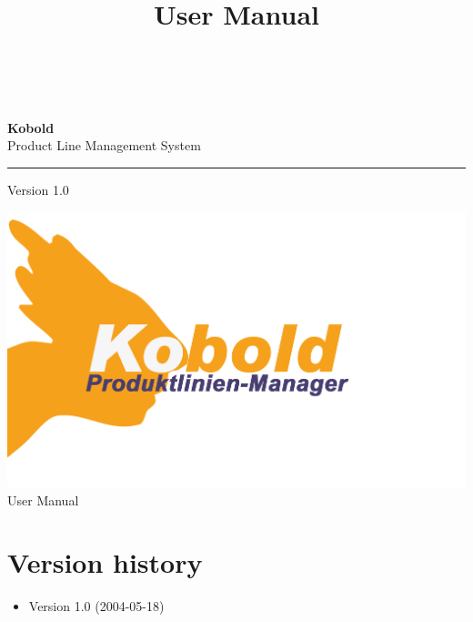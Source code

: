 \documentclass[a4paper,titlepage,12pt]{scrbook}
\title {\huge \product\\[0.5cm]\large User Manual \\[0.5cm] \version
  \\[1cm] \Large \company}
\newcommand\version{Version 1.0\xspace}
\begin{document}

\begin{titlepage}
\renewcommand{\thefootnote}{\fnsymbol{footnote}}
{\Huge
\raggedright
\textbf{\bf Kobold} \\
\huge Product Line Management System
\rule{\textwidth}{0.75pt}
\par
}
\begin{flushleft}
\normalsize
\version
\end{flushleft}


\vfill
\includegraphics[width=15cm]{../common/logo-color.png}
\vfill
{\parindent=0cm
\Huge User Manual
}


\setcounter{footnote}{0}
\end{titlepage}


\section*{Version history}

\begin{itemize}

\item Version 1.0 (2004-05-18)

\end{itemize}

\tableofcontents








\end{document}
